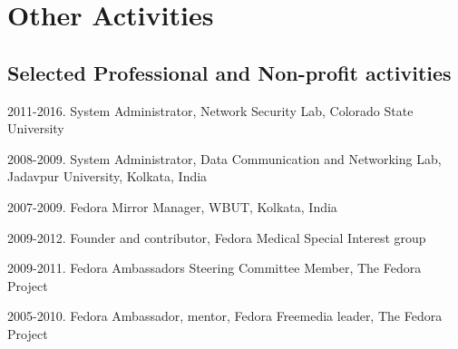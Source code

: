 \section{Other Activities}
\subsection{Selected Professional and Non-profit activities}
\begin{cvlist}
    \item {2011-2016.} System Administrator, Network Security Lab, Colorado State University
    \item {2008-2009.} System Administrator, Data Communication and  Networking Lab, Jadavpur University, Kolkata, India
    \item {2007-2009.} Fedora Mirror Manager, WBUT, Kolkata, India
    \item {2009-2012.} Founder and contributor, Fedora Medical Special Interest group
    \item {2009-2011.} Fedora Ambassadors Steering Committee Member, The Fedora Project
    \item {2005-2010.} Fedora Ambassador, mentor, Fedora Freemedia leader, The Fedora Project
\end{cvlist}
